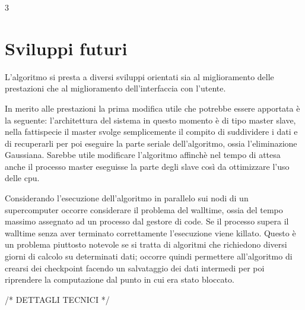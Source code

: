 3%
\section{Sviluppi futuri}
\label{sec:sviluppi}


L'algoritmo si presta a diversi sviluppi orientati sia al miglioramento delle prestazioni che al miglioramento dell'interfaccia
con l'utente.

In merito alle prestazioni la prima modifica utile che potrebbe essere apportata è la seguente:
l'architettura del sistema in questo momento è di tipo master slave, nella fattispecie il master svolge semplicemente il compito di suddividere  
i dati e di recuperarli per poi eseguire la parte seriale dell'algoritmo, ossia l'eliminazione Gaussiana.
Sarebbe utile modificare l'algoritmo affinchè nel tempo di attesa anche il processo master eseguisse la parte degli slave così da ottimizzare
l'uso delle cpu.

Considerando l'esecuzione dell'algoritmo in parallelo sui nodi di un supercomputer occorre considerare il problema del walltime, ossia
del tempo massimo assegnato ad un processo dal gestore di code.
Se il processo supera il walltime senza aver terminato correttamente l'esecuzione viene killato.
Questo è un problema piuttosto notevole se si tratta di algoritmi che richiedono diversi giorni di calcolo su determinati dati; occorre quindi
permettere all'algoritmo di crearsi dei checkpoint facendo un salvataggio dei dati intermedi per poi riprendere la computazione dal punto in 
cui era stato bloccato.

/*
        DETTAGLI TECNICI
*/

